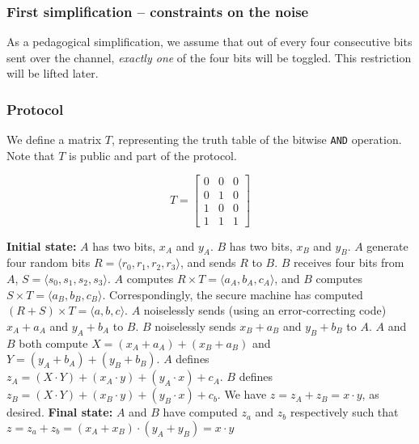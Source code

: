 \documentclass[11pt]{article}
\begin{document}
\subsubsection{First simplification -- constraints on the noise}

As a pedagogical simplification, we assume that out of every four consecutive bits sent over the channel, \textit{exactly one} of the four bits will be toggled. This restriction will be lifted later. 

\subsubsection{Protocol}

We define a matrix $T$, representing the truth table of the bitwise \texttt{AND} operation. Note that $T$ is public and part of the protocol.

\[T = 
\begin{bmatrix}
0 & 0 & 0 \\
0 & 1 & 0 \\
1 & 0 & 0 \\
1 & 1 & 1
\end{bmatrix}
\]

\begin{algorithm}
\label{a-enc-h}
\begin{algorithmic}[1]
\State \textbf{Initial state:} $A$ has two bits, $x_A$ and $y_A$. $B$ has two bits, $x_B$ and $y_B$.
\State $A$ generate four random bits $R = \langle r_0, r_1, r_2, r_3 \rangle$, and sends $R$ to $B$.
\State $B$ receives four bits from $A$, $S = \langle  s_0, s_1, s_2, s_3 \rangle$.
\State $A$ computes $R \times T = \langle a_A, b_A, c_A \rangle$, and $B$ computes $S \times T = \langle a_B, b_B, c_B \rangle$. Correspondingly, the secure machine has computed $(R + S) \times T = \langle a, b, c \rangle $.
\State $A$ noiselessly sends (using an error-correcting code) $x_A + a_A$ and $y_A + b_A$ to $B$. $B$ noiselessly sends $x_B + a_B$ and $y_B + b_B$ to $A$.
\State $A$ and $B$ both compute $X = (x_A + a_A) + (x_B + a_B)$ and $Y = (y_A + b_A) + (y_B + b_B)$.
\State $A$ defines $z_A = (X \cdot Y) + (x_A \cdot y) + (y_A \cdot x) + c_A$.
\State $B$ defines $z_B = (X \cdot Y) + (x_B \cdot y) + (y_B \cdot x) + c_b$. We have $z = z_A + z_B = x \cdot y$, as desired.
\State \textbf{Final state:} $A$ and $B$ have computed $z_a$ and $z_b$ respectively such that $z = z_a + z_b = (x_A + x_B) \cdot (y_A + y_B) = x \cdot y$
\end{algorithmic}
\end{algorithm}
\end{document}

